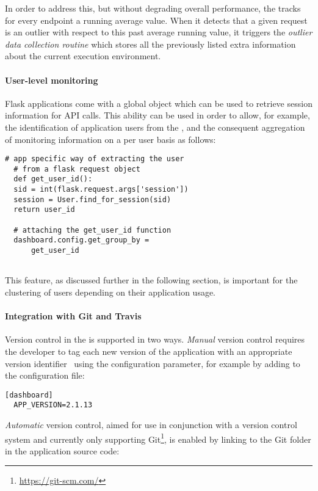\documentclass{sig-alternate-05-2015}
\begin{document}
  In order to address this, but without degrading overall performance, the \tool tracks for every endpoint a running average value. When it detects that a given request is an outlier with respect to this past average running value, it triggers the {\em outlier data collection routine} which stores all the previously listed extra information about the current execution environment. 
  
  \paragraph{User-level monitoring}
  
  Flask applications come with a global  object which can be used to retrieve session information for API calls. This ability can be used in order to allow, for example, the identification of application users from the \tool, and the consequent aggregation of monitoring information on a per user basis as follows: 
  
  \begin{lstlisting}[style=custompython]  
  # app specific way of extracting the user
  # from a flask request object    
  def get_user_id():
  sid = int(flask.request.args['session'])
  session = User.find_for_session(sid)
  return user_id
  
  # attaching the get_user_id function
  dashboard.config.get_group_by = 
      get_user_id
  
  \end{lstlisting}
  This feature, as discussed further in the following section, is important for the clustering of users depending on their application usage.
  
  \paragraph{Integration with Git and Travis}
  
  Version control in the \tool is supported in two ways. \textit{Manual} version control requires the developer to tag each new version of the application with an appropriate version identifier~\cite{papazoglou2011managing} using the  configuration parameter, for example by adding to the configuration file:
  
  \begin{lstlisting}[style=custompython]
  [dashboard]
  APP_VERSION=2.1.13
  \end{lstlisting}
  
  \textit{Automatic} version control, aimed for use in conjunction with a version control system and currently only supporting Git\footnote{\url{https://git-scm.com/}}, is enabled by linking to the Git folder in the application source code: 
  
\end{document}
